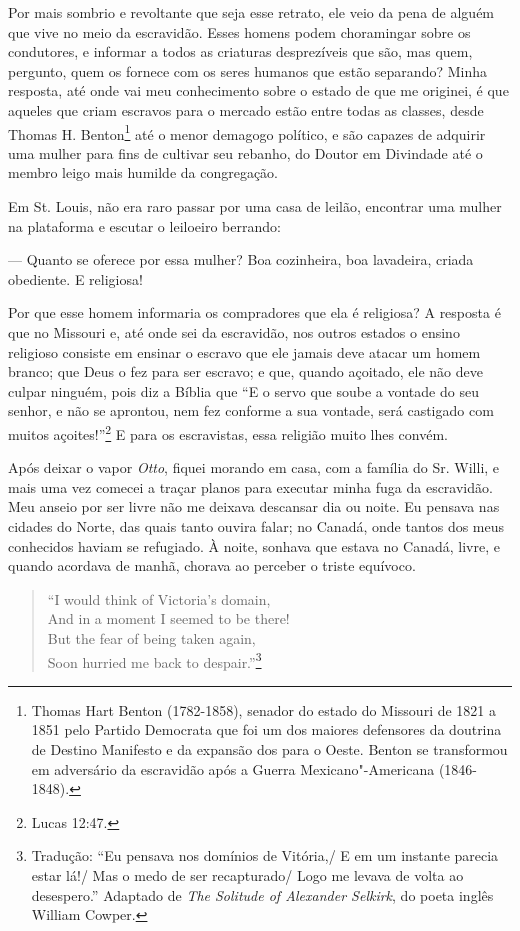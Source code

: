 Por mais sombrio e revoltante que seja esse retrato, ele veio da pena de
alguém que vive no meio da escravidão. Esses homens podem choramingar
sobre os condutores, e informar a todos as criaturas desprezíveis que
são, mas quem, pergunto, quem os fornece com os seres humanos que estão
separando? Minha resposta, até onde vai meu conhecimento sobre o estado
de que me originei, é que aqueles que criam escravos para o mercado
estão entre todas as classes, desde Thomas H. Benton\footnote{Thomas
  Hart Benton (1782-1858), senador do estado do Missouri de 1821 a 1851
  pelo Partido Democrata que foi um dos maiores defensores da doutrina
  de Destino Manifesto e da expansão dos  para o Oeste. Benton se
  transformou em adversário da escravidão após a Guerra
  Mexicano"-Americana (1846-1848).} até o menor demagogo político, e são
capazes de adquirir uma mulher para fins de cultivar seu rebanho, do
Doutor em Divindade até o membro leigo mais humilde da congregação.

Em St. Louis, não era raro passar por uma casa de leilão, encontrar uma
mulher na plataforma e escutar o leiloeiro berrando:

--- Quanto se oferece por essa mulher? Boa cozinheira, boa lavadeira,
criada obediente. E religiosa!

Por que esse homem informaria os compradores que ela é religiosa? A
resposta é que no Missouri e, até onde sei da escravidão, nos outros
estados o ensino religioso consiste em ensinar o escravo que ele jamais
deve atacar um homem branco; que Deus o fez para ser escravo; e que,
quando açoitado, ele não deve culpar ninguém, pois diz a Bíblia que ``E
o servo que soube a vontade do seu senhor, e não se aprontou, nem fez
conforme a sua vontade, será castigado com muitos açoites!''\footnote{Lucas
  12:47.} E para os escravistas, essa religião muito lhes convém.

Após deixar o vapor \emph{Otto}, fiquei morando em casa, com a família
do Sr. Willi, e mais uma vez comecei a traçar planos para executar minha
fuga da escravidão. Meu anseio por ser livre não me deixava descansar
dia ou noite. Eu pensava nas cidades do Norte, das quais tanto ouvira
falar; no Canadá, onde tantos dos meus conhecidos haviam se refugiado. À
noite, sonhava que estava no Canadá, livre, e quando acordava de manhã,
chorava ao perceber o triste equívoco.

\begin{verse}
``I would think of Victoria's domain,\\
And in a moment I seemed to be there!\\
But the fear of being taken again,\\
Soon hurried me back to despair.''\footnote{Tradução: ``Eu pensava nos domínios de Vitória,/ E em um instante parecia estar lá!/ Mas o medo de ser recapturado/ Logo me levava de volta ao desespero.'' Adaptado de \emph{The Solitude of Alexander Selkirk}, do poeta inglês William Cowper.}
\end{verse}


